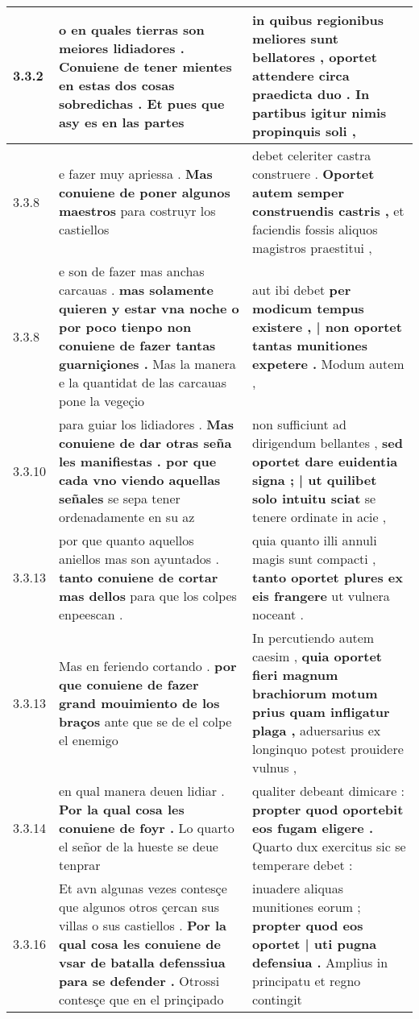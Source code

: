 \begin{tabular}{|p{1cm}|p{6.5cm}|p{6.5cm}|}
3.3.2 & o en quales tierras son meiores lidiadores . \textbf{ Conuiene de tener mientes en estas dos cosas sobredichas . } Et pues que asy es en las partes & in quibus regionibus meliores sunt bellatores , \textbf{ oportet attendere circa praedicta duo . } In partibus igitur nimis propinquis soli , \\\hline
3.3.8 & e fazer muy apriessa . \textbf{ Mas conuiene de poner algunos maestros } para costruyr los castiellos & debet celeriter castra construere . \textbf{ Oportet autem semper construendis castris , } et faciendis fossis aliquos magistros praestitui , \\\hline
3.3.8 & e son de fazer mas anchas carcauas . \textbf{ mas solamente quieren y estar vna noche o por poco tienpo non conuiene de fazer tantas guarniçiones . } Mas la manera e la quantidat de las carcauas pone la vegeçio & aut ibi debet \textbf{ per modicum tempus existere , | non oportet tantas munitiones expetere . } Modum autem , \\\hline
3.3.10 & para guiar los lidiadores . \textbf{ Mas conuiene de dar otras seña les manifiestas . por que cada vno viendo aquellas señales } se sepa tener ordenadamente en su az & non sufficiunt ad dirigendum bellantes , \textbf{ sed oportet dare euidentia signa ; | ut quilibet solo intuitu sciat } se tenere ordinate in acie , \\\hline
3.3.13 & por que quanto aquellos aniellos mas son ayuntados . \textbf{ tanto conuiene de cortar mas dellos } para que los colpes enpeescan . & quia quanto illi annuli magis sunt compacti , \textbf{ tanto oportet plures ex eis frangere } ut vulnera noceant . \\\hline
3.3.13 & Mas en feriendo cortando . \textbf{ por que conuiene de fazer grand mouimiento de los braços } ante que se de el colpe el enemigo & In percutiendo autem caesim , \textbf{ quia oportet fieri magnum brachiorum motum prius quam infligatur plaga , } aduersarius ex longinquo potest prouidere vulnus , \\\hline
3.3.14 & en qual manera deuen lidiar . \textbf{ Por la qual cosa les conuiene de foyr . } Lo quarto el señor de la hueste se deue tenprar & qualiter debeant dimicare : \textbf{ propter quod oportebit eos fugam eligere . } Quarto dux exercitus sic se temperare debet : \\\hline
3.3.16 & Et avn algunas vezes contesçe que algunos otros çercan sus villas o sus castiellos . \textbf{ Por la qual cosa les conuiene de vsar de batalla defenssiua para se defender . } Otrossi contesçe que en el prinçipado & inuadere aliquas munitiones eorum ; \textbf{ propter quod eos oportet | uti pugna defensiua . } Amplius in principatu et regno contingit \\\hline

\end{tabular}
